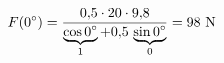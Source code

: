 \documentclass[preview]{standalone}
\begin{document}
\begin{align*}
\special{dvisvgm:raw <g id='unique000'>}F(0^\circ)=\dfrac{0{,}5\cdot 20\cdot 9{,}8}{\underbrace{\cos 0^\circ}_{1}+0{,}5\,\underbrace{\sin 0^\circ}_{0}}=98\ \mathrm{N}\special{dvisvgm:raw </g>}
\end{align*}
\end{document}
